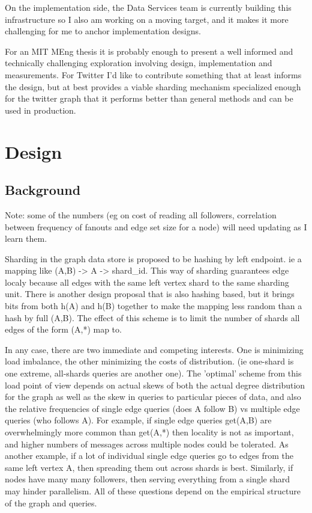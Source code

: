 \documentclass{article}
\begin{document}
On the implementation side, the Data Services team is currently building this infrastructure so I also am working on a moving target, and it makes it more challenging for me to anchor implementation designs.

For an MIT MEng thesis it is probably enough to present a well informed and technically challenging exploration involving design, implementation and measurements. For Twitter I'd like to contribute something that at least informs the design, but at best provides a viable sharding mechanism specialized enough for the twitter graph that it performs better than general methods and can be used in production.

\section{Design}
\subsection{Background}
Note: some of the numbers (eg on cost of reading all followers, correlation between frequency of fanouts and edge set size for a node) will need updating as I learn them.

Sharding in the graph data store is proposed to be hashing by left endpoint.  ie a mapping like (A,B) -> A -> shard\_id. This way of sharding guarantees edge localy because all edges with the same left vertex shard to the same sharding unit.  There is another design proposal that is also hashing based, but it brings bits from both h(A) and h(B) together to make the mapping less random than a hash by full (A,B). The effect of this scheme is to limit the number of shards all edges of the form (A,*) map to.

In any case, there are two immediate and competing interests. One is minimizing load imbalance, the other minimizing the costs of distribution. (ie one-shard is one extreme, all-shards queries are another one). The 'optimal' scheme from this load point of view depends on actual skews of both the actual degree distribution for the graph as well as the skew in queries to particular pieces of data, and also the relative frequencies of single edge queries (does A follow B) vs multiple edge queries (who follows A).  For example, if single edge queries get(A,B) are overwhelmingly more common than get(A,*) then locality is not as important, and higher numbers of messages across multiple nodes could be tolerated.  As another example, if a lot of individual single edge queries go to edges from the same left vertex A, then spreading them out across shards is best.  Similarly, if nodes have many many followers, then serving everything from a single shard may hinder parallelism. All of these questions depend on the empirical structure of the graph and queries.
\end{document}
